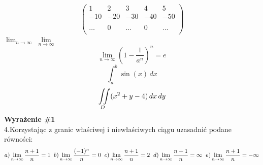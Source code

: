 \documentclass[12pt]{article}
\begin{document}
$$
\left(
\begin{array}{ccccc}
1 & 2 & 3 & 4 &5 \\
-10 & -20 & -30 & -40 & -50 \\
\\
\ldots & 0 & \ldots & 0  & \ldots \\
\end{array}
\right)
$$
$\lim_{n \to \infty}$
$\lim\limits _{n \to \infty}$
$$\lim _{n \to \infty}
\left(
1-\frac{1}{a^n}
\right)^n=e
$$
$$
\int _a^b \sin(x) \, dx
$$
$$
\iint\displaylimits _D(x^2+y-4) \, dx \, dy
$$
\textbf{Wyrażenie \#1}
\\
4.Korzystając z granic właściwej i niewłaściwych ciągu uzasadnić podane równości:
\\
$$
a)
\lim \limits_{n \to \infty} \frac{n+1}{n}=1
 \hspace{2mm} b)
\lim \limits_{n \to \infty} \frac{(-1)^n}{n}=0
 \hspace{2mm} c)
\lim \limits_{n \to \infty} \frac{n+1}{n}=2
 \hspace{2mm} d)
\lim \limits_{n \to \infty} \frac{n+1}{n}=\infty
 \hspace{2mm} e)
\lim \limits_{n \to \infty} \frac{n+1}{n}=-\infty
$$
\end{document}
